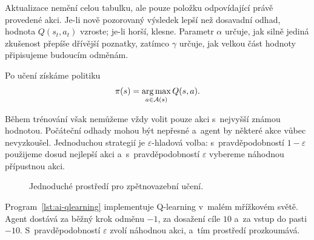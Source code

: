 Aktualizace nemění celou tabulku, ale pouze položku odpovídající právě provedené akci. Je-li nově pozorovaný výsledek lepší než dosavadní odhad, hodnota \(Q(s_t,a_t)\) vzroste; je-li horší, klesne. Parametr \(\alpha\) určuje, jak silně jediná zkušenost přepíše dřívější poznatky, zatímco \(\gamma\) určuje, jak velkou část hodnoty připisujeme budoucím odměnám.

Po učení získáme politiku
\[
    \pi(s)=\operatorname*{arg\,max}_{a\in\mathcal{A}(s)}Q(s,a).
\]

Během trénování však nemůžeme vždy volit pouze akci s~nejvyšší známou hodnotou. Počáteční odhady mohou být nepřesné a~agent by některé akce vůbec nevyzkoušel. Jednoduchou strategií je \(\varepsilon\)-hladová volba: s~pravděpodobností \(1-\varepsilon\) použijeme dosud nejlepší akci a~s~pravděpodobností \(\varepsilon\) vybereme náhodnou přípustnou akci.

\begin{algorithm}
    \caption{\textsc{q-learning}}
    \label{alg:ai-qlearning}
\end{algorithm}

\begin{figure}[ht]
    \centering
    
    \caption{Jednoduché prostředí pro zpětnovazební učení.}
    \label{fig:ai-gridworld}
\end{figure}

Program~\ref{lst:ai-qlearning} implementuje Q-learning v~malém mřížkovém světě. Agent dostává za běžný krok odměnu \(-1\), za dosažení cíle \(10\) a~za vstup do pasti \(-10\). S~pravděpodobností \(\varepsilon\) zvolí náhodnou akci, a~tím prostředí prozkoumává.

